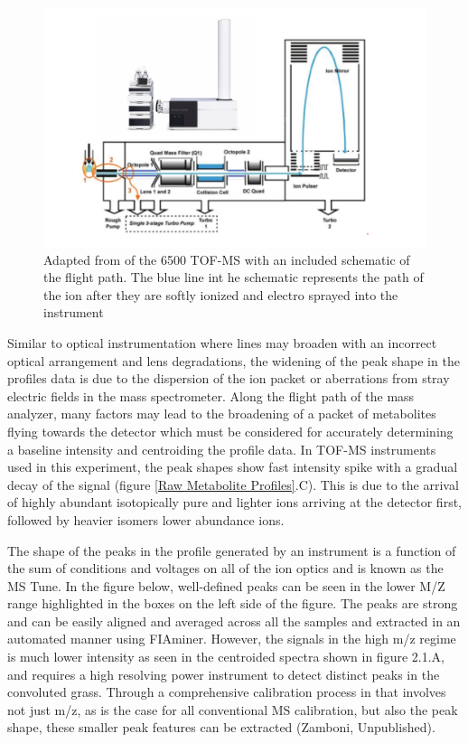 \documentclass[a4paper,11pt,twoside]{book}
\begin{document}
	\begin{figure}[hbt!]
		\centering
		\includegraphics[width=\linewidth]{3.Metabolomics/MS.pdf}
		\caption{Adapted from \citep{AgilentTechnologies2017} of the 6500 TOF-MS with an included schematic of the flight path. The blue line int he schematic represents the path of the ion after they are softly ionized and electro sprayed into the instrument }
		\label{fig:A schematic of the 6550 Time-of-flight Mass spectrometer}
	\end{figure}
	
    Similar to optical instrumentation where lines may broaden with an incorrect optical arrangement and lens degradations, the widening of the peak shape in the profiles data is due to the dispersion of the ion packet or aberrations from stray electric fields in the mass spectrometer\citep{Glish2003TheCentury}. Along the flight path of the mass analyzer, many factors may lead to the broadening of a packet of metabolites flying towards the detector which must be considered for accurately determining a baseline intensity and centroiding the profile data. In TOF-MS instruments used in this experiment, the peak shapes show fast intensity spike with a gradual decay of the signal (figure \ref{Raw Metabolite Profiles}.C). This is due to the arrival of highly abundant isotopically pure and lighter ions arriving at the detector first, followed by heavier isomers lower abundance ions.
	
    The shape of the peaks in the profile generated by an instrument is a function of the sum of conditions and voltages on all of the ion optics and is known as the MS Tune. In the figure below, well-defined peaks can be seen in the lower M/Z range highlighted in the boxes on the left side of the figure. The peaks are strong and can be easily aligned and averaged across all the samples and extracted in an automated manner using FIAminer. However, the signals in the high m/z regime is much lower intensity as seen in the centroided spectra shown in figure 2.1.A, and requires a high resolving power instrument to detect distinct peaks in the convoluted grass. Through a comprehensive calibration process in that involves not just m/z, as is the case for all conventional MS calibration, but also the peak shape, these smaller peak features can be extracted (Zamboni, Unpublished). 
	
\end{document}

